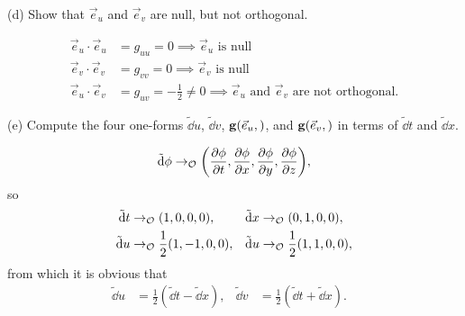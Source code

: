 \documentclass[gr-notes.tex]{subfiles}
\begin{document}
(d)
Show that $\vec{e}_u$ and $\vec{e}_v$ are null, but not orthogonal.

\begin{align*}
  \vec{e}_u \cdot \vec{e}_u &= g_{uu} = 0
  \implies \vec{e}_u \text{ is null}
  \\
  \vec{e}_v \cdot \vec{e}_v &= g_{vv} = 0
  \implies \vec{e}_v \text{ is null}
  \\
  \vec{e}_u \cdot \vec{e}_v &= g_{uv} = -\frac{1}{2} \neq 0
  \implies \vec{e}_u \text{ and } \vec{e}_v \text{ are not orthogonal.}
\end{align*}

(e)
Compute the four one-forms $\tilde\dd{u}$, $\tilde\dd{v}$, $\vb{g}(\vec{e}_u,)$, and $\vb{g}(\vec{e}_v,)$ in terms of $\tilde\dd{t}$ and $\tilde\dd{x}$.

\begin{displaymath}
  \tilde\dd\phi \to_{\mathcal{O}}
  \qty( \pdv{\phi}{t}, \pdv{\phi}{x}, \pdv{\phi}{y}, \pdv{\phi}{z} ),
\end{displaymath}
%
so
\begin{align*}
  \tilde\dd{t} &\to_{\mathcal{O}} (1, 0, 0, 0), &
  \tilde\dd{x} &\to_{\mathcal{O}} (0, 1, 0, 0),
  \\
  \tilde\dd{u} &\to_{\mathcal{O}} \frac{1}{2} (1, -1, 0, 0), &
  \tilde\dd{u} &\to_{\mathcal{O}} \frac{1}{2} (1,  1, 0, 0),
\end{align*}
%
from which it is obvious that
\begin{align*}
  \tilde\dd{u} &=
  \frac{1}{2} (\tilde\dd{t} - \tilde\dd{x}), &
  \tilde\dd{v} &=
  \frac{1}{2} (\tilde\dd{t} + \tilde\dd{x}). &
\end{align*}
\end{document}
